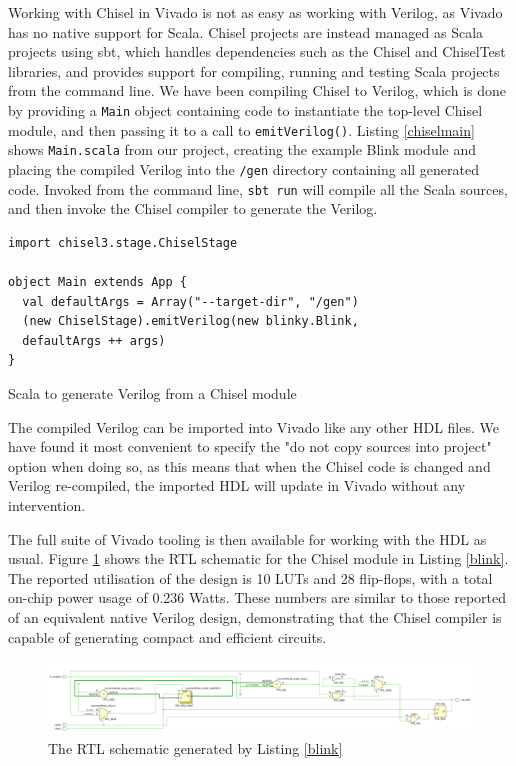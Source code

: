 \documentclass[a4paper,fleqn,12pt]{article}
\begin{document}
Working with Chisel in Vivado is not as easy as working with Verilog, as Vivado has no native support for Scala. Chisel projects are instead managed as Scala projects using sbt, which handles dependencies such as the Chisel and ChiselTest libraries, and provides support for compiling, running and testing Scala projects from the command line. We have been compiling Chisel to Verilog, which is done by providing a \texttt{Main} object containing code to instantiate the top-level Chisel module, and then passing it to a call to \texttt{emitVerilog()}. Listing \ref{chiselmain} shows \texttt{Main.scala} from our project, creating the example Blink module and placing the compiled Verilog into the \texttt{/gen} directory containing all generated code. Invoked from the command line, \texttt{sbt run} will compile all the Scala sources, and then invoke the Chisel compiler to generate the Verilog.

\begin{listing}[]
    \vspace{0.5cm}
    \begin{verbatim}
import chisel3.stage.ChiselStage

object Main extends App {
  val defaultArgs = Array("--target-dir", "/gen")
  (new ChiselStage).emitVerilog(new blinky.Blink,
  defaultArgs ++ args)
}
    \end{verbatim}
    \caption{Scala to generate Verilog from a Chisel module}
    \label{chiselmain}
\end{listing}

The compiled Verilog can be imported into Vivado like any other HDL files. We have found it most convenient to specify the "do not copy sources into project" option when doing so, as this means that when the Chisel code is changed and Verilog re-compiled, the imported HDL will update in Vivado without any intervention.

The full suite of Vivado tooling is then available for working with the HDL as usual. Figure \ref{fig:rtl} shows the RTL schematic for the Chisel module in Listing \ref{blink}. The reported utilisation of the design is 10 LUTs and 28 flip-flops, with a total on-chip power usage of 0.236 Watts. These numbers are similar to those reported of an equivalent native Verilog design, demonstrating that the Chisel compiler is capable of generating compact and efficient circuits.

\begin{figure}[h!]
    \centering
    \includegraphics[width=\textwidth]{../img/blinky-rtl.png}
    \caption{The RTL schematic generated by Listing \ref{blink}}
    \label{fig:rtl}
\end{figure}
\end{document}
